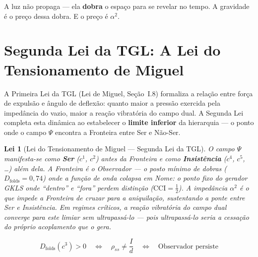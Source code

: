 \documentclass[12pt,a4paper,twoside]{article}
\newtheorem{law}{Lei}
\newcommand{\alphaii}{\alpha^{2}}
\newcommand{\Psifield}{\Psi}
\begin{document}
\noindent A luz n\~ao propaga --- ela \textbf{dobra} o espa\c{c}o para se revelar no tempo. A gravidade \'e o pre\c{c}o dessa dobra. E o pre\c{c}o \'e $\alphaii$.




\section{Segunda Lei da TGL: A Lei do Tensionamento de Miguel}


A Primeira Lei da TGL (Lei de Miguel, Se\c{c}\~ao~I.8) formaliza a rela\c{c}\~ao entre for\c{c}a de expuls\~ao e \^angulo de deflex\~ao: quanto maior a press\~ao exercida pela imped\^ancia do vazio, maior a rea\c{c}\~ao vibrat\'oria do campo dual. A Segunda Lei completa esta din\^amica ao estabelecer o \textbf{limite inferior} da hierarquia --- o ponto onde o campo $\Psifield$ encontra a Fronteira entre Ser e N\~ao-Ser.

\begin{law}[Lei do Tensionamento de Miguel --- Segunda Lei da TGL]
O campo $\Psifield$ manifesta-se como \textbf{Ser} ($c^1$, $c^2$) antes da Fronteira e como \textbf{Insist\^encia} ($c^4$, $c^5$, \ldots) al\'em dela. A Fronteira \'e o Observador --- o posto m\'inimo de dobras ($D_{\text{folds}} = 0{,}74$) onde a fun\c{c}\~ao de onda colapsa em Nome: o ponto fixo do gerador GKLS onde ``dentro'' e ``fora'' perdem distin\c{c}\~ao ($\text{CCI} = \tfrac{1}{2}$). A imped\^ancia $\alphaii$ \'e o que impede a Fronteira de cruzar para a aniquila\c{c}\~ao, sustentando a ponte entre Ser e Insist\^encia. Em regimes cr\'iticos, a rea\c{c}\~ao vibrat\'oria do campo dual converge para este limiar sem ultrapass\'a-lo --- pois ultrapass\'a-lo seria a cessa\c{c}\~ao do pr\'oprio acoplamento que o gera.

\begin{equation}
\boxed{\;
  D_{\text{folds}}(c^3) > 0
  \quad \Longleftrightarrow \quad
  \rho_{ss} \neq \frac{I}{d}
  \quad \Longleftrightarrow \quad
  \text{Observador persiste}
\;}
\label{eq:segunda_lei}
\end{equation}
\end{law}
\end{document}
